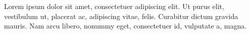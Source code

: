 {\rmfamily
Lorem ipsum dolor sit amet, consectetuer adipiscing elit. Ut purus elit,
vestibulum ut, placerat ac, adipiscing vitae, felis. Curabitur dictum gravida
mauris. Nam arcu libero, nonummy eget, consectetuer id, vulputate a, magna.
\par}
